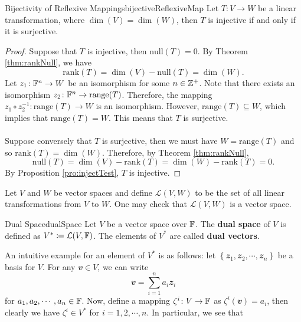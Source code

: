\documentclass[math]{amznotes}
\theoremstyle{remark}
\begin{document}
\begin{corbox}{Bijectivity of Reflexive Mappings}{bijectiveReflexiveMap}
    Let $T \colon V \to W$ be a linear transformation, where $\dim(V) = \dim(W)$, then $T$ is injective if and only if it is surjective.
    \tcblower
    \begin{proof}
        Suppose that $T$ is injective, then $\mathrm{null}(T) = 0$. By Theorem \ref{thm:rankNull}, we have 
        \begin{equation*}
            \mathrm{rank}(T) = \dim(V) - \mathrm{null}(T) = \dim(W).
        \end{equation*} 
        Let $z_1 \colon \mathbb{F}^n \to W$ be an isomorphism for some $n \in \mathbb{Z}^+$. Note that there exists an isomorphism $z_2 \colon \mathbb{F}^n \to \mathrm{range}(T)$. Therefore, the mapping $z_1 \circ z_2^{-1} \colon \mathrm{range}(T) \to W$ is an isomorphism. However, $\mathrm{range}(T) \subseteq W$, which implies that $\mathrm{range}(T) = W$. This means that $T$ is surjective.
        \\\\
        Suppose conversely that $T$ is surjective, then we must have $W = \mathrm{range}(T)$ and so $\mathrm{rank}(T) = \dim(W)$. Therefore, by Theorem \ref{thm:rankNull}, 
        \begin{equation*}
            \mathrm{null}(T) = \dim(V) - \mathrm{rank}(T) = \dim(W) - \mathrm{rank}(T) = 0.
        \end{equation*}
        By Proposition \ref{pro:injectTest}, $T$ is injective.
    \end{proof}
\end{corbox}
Let $V$ and $W$ be vector spaces and define $\mathcal{L}(V, W)$ to be the set of all linear transformations from $V$ to $W$. One may check that $\mathcal{L}(V, W)$ is a vector space.
\begin{dfnbox}{Dual Space}{dualSpace}
    Let $V$ be a vector space over $\mathbb{F}$. The {\color{red} \textbf{dual space}} of $V$ is defined as $V^* \coloneqq \mathcal{L}(V, \mathbb{F})$. The elements of $V^*$ are called {\color{red} \textbf{dual vectors}}.
\end{dfnbox}
An intuitive example for an element of $V^*$ is as follows: let $\left\{\mathbfit{z}_1, \mathbfit{z}_2, \cdots, \mathbfit{z}_n\right\}$ be a basis for $V$. For any $\mathbfit{v} \in V$, we can write
\begin{equation*}
    \mathbfit{v} = \sum_{i = 1}^{n}a_i\mathbfit{z}_i
\end{equation*}
for $a_1, a_2, \cdots, a_n \in \mathbb{F}$. Now, define a mapping $\zeta^i \colon V \to \mathbb{F}$ as $\zeta^i(\mathbfit{v}) = a_i$, then clearly we have $\zeta^i \in V^*$ for $i = 1, 2, \cdots, n$. In particular, we see that
\end{document}
